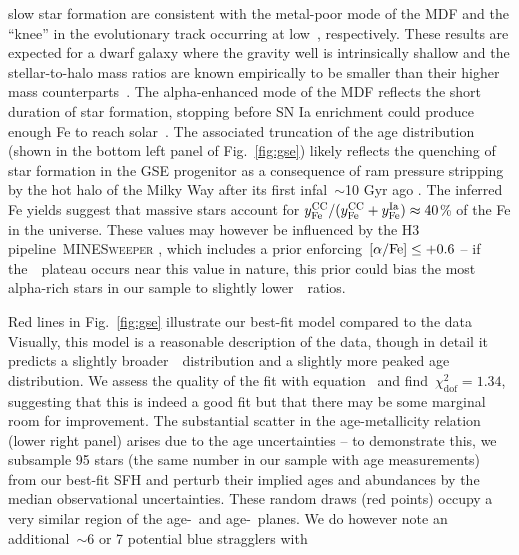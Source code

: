 \documentclass[ms.tex]{subfiles}
\begin{document}
slow star formation are consistent with the metal-poor mode of the MDF and the
``knee'' in the evolutionary track occurring at low~\feh, respectively.
These results are expected for a dwarf galaxy where the gravity well is
intrinsically shallow and the stellar-to-halo mass ratios are known empirically
to be smaller than their higher mass counterparts~\citep{Hudson2015}.
The alpha-enhanced mode of the MDF reflects the short duration of star
formation, stopping before SN Ia enrichment could produce enough Fe to reach
solar~\afe.
The associated truncation of the age distribution (shown in the bottom left
panel of Fig.~\ref{fig:gse}) likely reflects the quenching of star
formation in the GSE progenitor as a consequence of ram pressure stripping by
the hot halo of the Milky Way after its first infal~$\sim$10 Gyr ago
\citep{Bonaca2020}.
The inferred Fe yields suggest that massive stars account for
$y_\text{Fe}^\text{CC} / (y_\text{Fe}^\text{CC} + y_\text{Fe}^\text{Ia}) \approx 40$\% of the Fe in the universe.
These values may however be influenced by the H3 pipeline~\textsc{MINESweeper}
\citep{Cargile2020}, which includes a prior enforcing~$\text{[$\alpha$/Fe]} \leq +0.6$ -- if
the~\afe~plateau occurs near this value in nature, this prior could bias the
most alpha-rich stars in our sample to slightly lower~\afe~ratios.
\par
Red lines in Fig.~\ref{fig:gse} illustrate our best-fit model compared to the
data
Visually, this model is a reasonable description of the data, though in detail
it predicts a slightly broader~\feh~distribution and a slightly more peaked age
distribution.
We assess the quality of the fit with equation~ and
find~$\chi_\text{dof}^2 = 1.34$, suggesting that this is indeed a good fit but
that there may be some marginal room for improvement.
The substantial scatter in the age-metallicity relation (lower right panel)
arises due to the age uncertainties -- to demonstrate this, we subsample 95
stars (the same number in our sample with age measurements) from our best-fit
SFH and perturb their implied ages and abundances by the median observational
uncertainties.
These random draws (red points) occupy a very similar region of the age-\feh~and
age-\afe~planes.
We do however note an additional~$\sim$6 or 7 potential blue stragglers with
\end{document}
